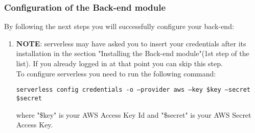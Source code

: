 \subsubsection{Configuration of the Back-end module}
By following the next steps you will successfully configure your back-end:
\begin{enumerate}
\item \textbf{NOTE}: serverless may have asked you to insert your credentials after its installation in the section "Installing the Back-end module"(1st step of the list). If you already logged in at that point you can skip this step.\\ 
To configure serverless you need to run the following command:
\begin{center}
\texttt{serverless config credentials -o --provider aws --key \$key --secret \$secret}
\end{center}
where "\$key" is your AWS Access Key Id and "\$secret" is your AWS Secret Access Key.
\end{enumerate}
